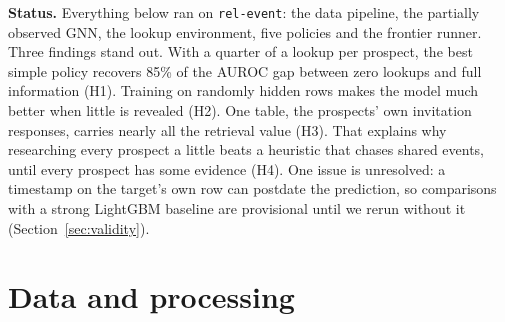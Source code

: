 \documentclass{article}
\begin{document}
\textbf{Status.} Everything below ran on \texttt{rel-event}: the data pipeline, the partially observed GNN, the lookup environment, five policies and the frontier runner. Three findings stand out. With a quarter of a lookup per prospect, the best simple policy recovers 85\% of the AUROC gap between zero lookups and full information (H1). Training on randomly hidden rows makes the model much better when little is revealed (H2). One table, the prospects' own invitation responses, carries nearly all the retrieval value (H3). That explains why researching every prospect a little beats a heuristic that chases shared events, until every prospect has some evidence (H4). One issue is unresolved: a timestamp on the target's own row can postdate the prediction, so comparisons with a strong LightGBM baseline are provisional until we rerun without it (Section~\ref{sec:validity}).

\section{Data and processing}
\label{sec:data}
\end{document}
